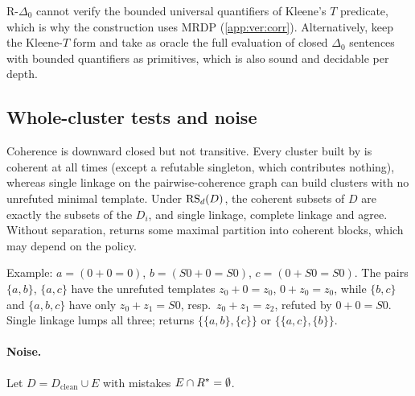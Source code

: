 R-$\Delta_0$ cannot verify the bounded universal quantifiers of Kleene's $T$ predicate, which is why the construction
uses MRDP (\cref{app:ver:corr}). Alternatively, keep the Kleene-$T$ form and take as oracle the full evaluation of
closed $\Delta_0$ sentences with bounded quantifiers as primitives, which is also sound and decidable per depth.

\subsection{Whole-cluster tests and noise}\label{app:many:noise}

\begin{proposition}\label{prop:many:linkage}
Coherence is downward closed but not transitive. Every cluster built by \DTRC{} is coherent at all times (except a
refutable singleton, which contributes nothing), whereas single linkage on the pairwise-coherence graph can build clusters
with no unrefuted minimal template. Under $\mathrm{RS}_d(D)$, the coherent subsets of $D$ are exactly the subsets of the $D_i$, and
single linkage, complete linkage and \DTRC{} agree. Without separation, \DTRC{} returns some maximal partition into
coherent blocks, which may depend on the policy.
\end{proposition}
Example: $a=(0+0=0)$, $b=(S0+0=S0)$, $c=(0+S0=S0)$. The pairs $\{a,b\}$, $\{a,c\}$ have the unrefuted templates
$z_0+0=z_0$, $0+z_0=z_0$, while $\{b,c\}$ and $\{a,b,c\}$ have only $z_0+z_1=S0$, resp.\ $z_0+z_1=z_2$, refuted by
$0+0=S0$. Single linkage lumps all three; \DTRC{} returns $\{\{a,b\},\{c\}\}$ or $\{\{a,c\},\{b\}\}$.

\paragraph{Noise.} Let $D=D_{\mathrm{clean}}\cup E$ with mistakes $E\cap R^{*}=\emptyset$.

